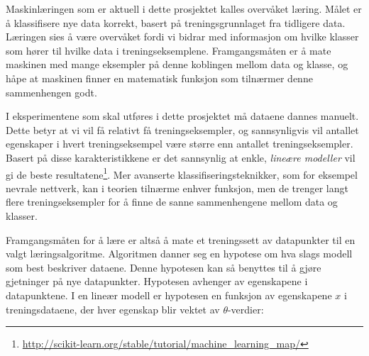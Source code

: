 Maskinlæringen som er aktuell i dette prosjektet kalles overvåket læring. Målet er å klassifisere nye data korrekt, basert på treningsgrunnlaget fra tidligere data. Læringen sies å være overvåket fordi vi bidrar med informasjon om hvilke klasser som hører til hvilke data i treningseksemplene. Framgangsmåten er å mate maskinen med mange eksempler på denne koblingen mellom data og klasse, og håpe at maskinen finner en matematisk funksjon som tilnærmer denne sammenhengen godt.

I eksperimentene som skal utføres i dette prosjektet må dataene dannes manuelt. Dette betyr at vi vil få relativt få treningseksempler, og sannsynligvis vil antallet egenskaper i hvert treningseksempel være større enn antallet treningseksempler. Basert på disse karakteristikkene er det sannsynlig at enkle, \emph{lineære modeller} vil gi de beste resultatene\footnote{\url{http://scikit-learn.org/stable/tutorial/machine_learning_map/}}. Mer avanserte klassifiseringsteknikker, som for eksempel nevrale nettverk, kan i teorien tilnærme enhver funksjon, men de trenger langt flere treningseksempler for å finne de sanne sammenhengene mellom data og klasser.

Framgangsmåten for å lære er altså å mate et treningssett av datapunkter til en valgt læringsalgoritme. Algoritmen danner seg en hypotese om hva slags modell som best beskriver dataene. Denne hypotesen kan så benyttes til å gjøre gjetninger på nye datapunkter. Hypotesen avhenger av egenskapene i datapunktene. I en lineær modell er hypotesen en funksjon av egenskapene $x$ i treningsdataene, der hver egenskap blir vektet av $\theta$-verdier:

